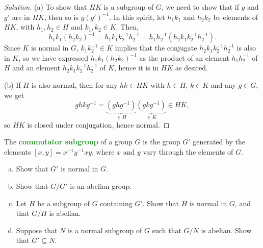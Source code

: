 \documentclass[11pt]{scrartcl}
\providecommand{\ii}{\item}
\providecommand{\inv}{^{-1}}
\newenvironment{soln}{\begin{proof}[Solution]}{\end{proof}}
\providecommand{\vocab}[1]{{\textbf{\textcolor{ForestGreen}{#1}}}}
\begin{document}
\begin{soln}
    (a) To show that $HK$ is a subgroup of $G$,
    we need to show that if $g$ and $g'$ are in $HK$,
    then so is $g(g')\inv$.
    In this spirit, let $h_1k_1$ and $h_2k_2$ be elements of $HK$,
    with $h_1,h_2\in H$ and $k_1,k_2\in K$. Then,
    \begin{equation*}
        h_1k_1(h_2k_2)\inv = h_1k_1k_2\inv h_2\inv =
	h_1 h_2\inv (h_2 k_1k_2\inv h_2\inv).
    \end{equation*}
    Since $K$ is normal in $G$, $k_1k_2\inv\in K$ implies that the conjugate
    $h_2 k_1k_2\inv h_2\inv$ is also in $K$,
    so we have expressed $h_1k_1(h_2k_2)\inv$ as the product of
    an element $h_1h_2\inv$ of $H$ and an element
    $h_2k_1k_2\inv h_2\inv$ of $K$, hence it is in $HK$ as desired.

    (b) If $H$ is also normal, then for any $hk\in HK$
    with $h\in H$, $k\in K$ and any $g\in G$, we get
    \begin{equation*}
	g hk g\inv = \underbrace{(ghg\inv)}_{\in H}
	\underbrace{(gkg\inv)}_{\in K}\in HK,
    \end{equation*}
    so $HK$ is closed under conjugation, hence normal.
\end{soln}

\pagebreak

\begin{problem}
    The \vocab{commutator subgroup} of a group $G$ is
    the group $G'$ generated by the elements $[x,y] = x\inv y\inv xy$,
    where $x$ and $y$ vary through the elements of $G$.
    \begin{enumerate}[(a)]
        \ii Show that $G'$ is normal in $G$.
	\ii Show that $G/G'$ is an abelian group.
	\ii Let $H$ be a subgroup of $G$ containing $G'$.
	Show that $H$ is normal in $G$, and that $G/H$ is abelian.
	\ii Suppose that $N$ is a normal subgroup of $G$
	such that $G/N$ is abelian. Show that $G'\subseteq N$.
    \end{enumerate}
\end{problem}
\end{document}
